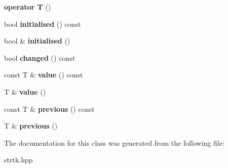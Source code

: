 \begin{DoxyCompactItemize}
\item 
\hypertarget{classstrtk_1_1util_1_1attribute_a10f83ad6d2d97b03fd8afe51d85e1a12}{{\bfseries operator T} ()}\label{classstrtk_1_1util_1_1attribute_a10f83ad6d2d97b03fd8afe51d85e1a12}

\item 
\hypertarget{classstrtk_1_1util_1_1attribute_a5e87f32f8bc03e93b98e5440489a4a03}{bool {\bfseries initialised} () const }\label{classstrtk_1_1util_1_1attribute_a5e87f32f8bc03e93b98e5440489a4a03}

\item 
\hypertarget{classstrtk_1_1util_1_1attribute_ad4dde528ca3c086b9a95cac0d37fd041}{bool \& {\bfseries initialised} ()}\label{classstrtk_1_1util_1_1attribute_ad4dde528ca3c086b9a95cac0d37fd041}

\item 
\hypertarget{classstrtk_1_1util_1_1attribute_a68128b0b1ebe6e8e8ac507d24371ec36}{bool {\bfseries changed} () const }\label{classstrtk_1_1util_1_1attribute_a68128b0b1ebe6e8e8ac507d24371ec36}

\item 
\hypertarget{classstrtk_1_1util_1_1attribute_aebdbc138cde6b605a8a98e8f5cbdc895}{const T \& {\bfseries value} () const }\label{classstrtk_1_1util_1_1attribute_aebdbc138cde6b605a8a98e8f5cbdc895}

\item 
\hypertarget{classstrtk_1_1util_1_1attribute_a4150d8e53a8cea37ac922e0246e22d95}{T \& {\bfseries value} ()}\label{classstrtk_1_1util_1_1attribute_a4150d8e53a8cea37ac922e0246e22d95}

\item 
\hypertarget{classstrtk_1_1util_1_1attribute_a8398732dc2d48093c8b688437678272f}{const T \& {\bfseries previous} () const }\label{classstrtk_1_1util_1_1attribute_a8398732dc2d48093c8b688437678272f}

\item 
\hypertarget{classstrtk_1_1util_1_1attribute_a58775bdc8f1e0e1d38efdf939f461d2b}{T \& {\bfseries previous} ()}\label{classstrtk_1_1util_1_1attribute_a58775bdc8f1e0e1d38efdf939f461d2b}

\end{DoxyCompactItemize}


The documentation for this class was generated from the following file\-:\begin{DoxyCompactItemize}
\item 
strtk.\-hpp\end{DoxyCompactItemize}
